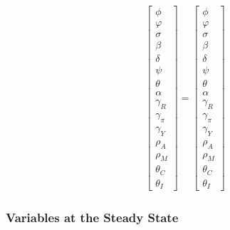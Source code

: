 \documentclass[
	12pt, 
	]{article}
\numberwithin{equation}{section}
\theoremstyle{definition}
\theoremstyle{plain}
\theoremstyle{plain}
\theoremstyle{plain}
\begin{document}
\begin{center}
	
	\begin{align}
		\begin{bmatrix}
			\phi       \\
			\varphi    \\
			\sigma     \\
			\beta      \\
			\delta     \\
			\psi       \\
			\theta     \\
			\alpha     \\
			\gamma_R   \\
			\gamma_\pi \\
			\gamma_Y   \\
			\rho_A     \\
			\rho_M     \\
			\theta_C   \\
			\theta_I
		\end{bmatrix} = 
		\begin{bmatrix}
			\phi       \\
			\varphi    \\
			\sigma     \\
			\beta      \\
			\delta     \\
			\psi       \\
			\theta     \\
			\alpha     \\
			\gamma_R   \\
			\gamma_\pi \\
			\gamma_Y   \\
			\rho_A     \\
			\rho_M     \\
			\theta_C   \\
			\theta_I   
		\end{bmatrix}
	\end{align}
	
\end{center}


\subsubsection{Variables at the Steady State}
\end{document}
